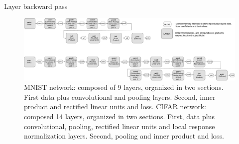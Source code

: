 \setlength{\textfloatsep}{0pt}%
\begin{algorithm}
\small
\caption{Layer backward pass}
\label{alg-back}
\BlankLine
{}
\end{algorithm}
%

\begin{figure}[]
\centering
\includegraphics[width=\linewidth]{figures/mnist-cifar.pdf}
\caption{MNIST network: composed of 9 layers, organized in two sections. First data plus convolutional and pooling layers. Second, inner product and rectified linear units and loss. CIFAR network: composed 14 layers, organized in two sections. First, data plus convolutional, pooling, rectified linear units and local response normalization layers. Second, pooling and inner product and loss.}
\label{fig-mnist-cifar}
\end{figure}

